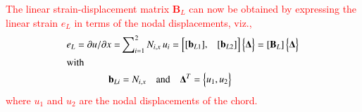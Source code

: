 \textcolor{red}{The linear strain-displacement matrix $\mathbf{B}_L$ can now be obtained by expressing the linear strain $e_L$ in terms of the nodal displacements, viz.,}
\begin{subequations}
	\begin{align}
	e_L  = 
	\partial u / \partial x   = &
	\sum\nolimits_{i=1}^2 N_{i,x} \, u_i = \begin{bmatrix}
	[\mathbf{b}_{L1}], & [\mathbf{b}_{L2}]
	\end{bmatrix}  \begin{Bmatrix} \boldsymbol{\Delta} \end{Bmatrix}  
	= [\mathbf{B}_L] \begin{Bmatrix} \boldsymbol{\Delta} \end{Bmatrix}\\
	\intertext{with} \mathbf{b}_{Li}  & = 
	N_{i,x} \quad \text{and} \quad
	\mathbf{\Delta}^T  = 
	\begin{Bmatrix}
	u_1 ,u_2
	\end{Bmatrix} 
	\end{align}
\end{subequations}
\textcolor{red}{where $u_1$ and $u_2$ are the nodal displacements of the chord.}

